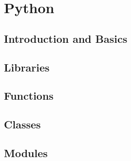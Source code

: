 \part{Python}

\chapter{Introduction and Basics}





\chapter{Libraries}




\chapter{Functions}





\chapter{Classes}




\chapter{Modules}





